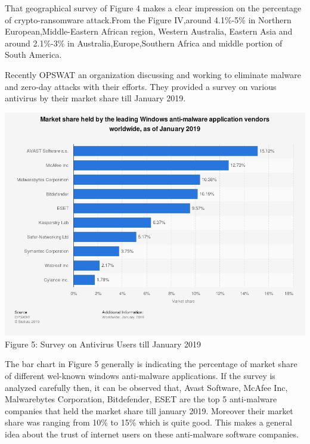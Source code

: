 \documentclass[conference,double column]{IEEEtran}
\begin{document}
	That geographical survey of Figure 4 makes a clear impression on the percentage of crypto-ransomware attack.From the Figure IV,around 4.1\%-5\% in Northern European,Middle-Eastern African region, Western Australia, Eastern Asia and around 2.1\%-3\% in Australia,Europe,Southern Africa and middle portion of South America.  
	
	
	Recently OPSWAT an organization discussing and working to eliminate malware and zero-day attacks with their efforts. They provided a survey on various antivirus by their market share till January 2019. 
	
	
	\begin{center}
		\includegraphics[scale=0.22]{antivsurvey.png}\\
		{\footnotesize Figure 5: Survey on Antivirus Users till January 2019~\cite{r14}}
	\end{center}
	
	The bar chart in Figure 5 generally is indicating the percentage of market share of different wel-known windows anti-malware applications. If the survey is analyzed carefully then, it can be observed that, Avast Software, McAfee Inc, Malwarebytes Corporation, Bitdefender, ESET are the top 5 anti-malware companies that held the market share till january 2019. Moreover their market share was ranging from 10\% to 15\% which is quite good. This makes a general idea about the trust of internet users on these anti-malware software companies.\\
	
\end{document}
